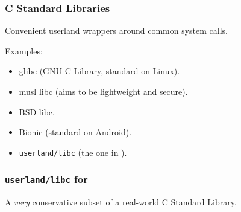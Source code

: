 \begin{frame}

\frametitle{C Standard Libraries}

\vspace{\fill}

\begin{center}

Convenient userland wrappers around common system calls.

\end{center}

\vspace{\fill}

Examples:

\begin{itemize}

\item glibc (GNU C Library, standard on Linux).

\item musl libc (aims to be lightweight and secure).

\item BSD libc.

\item Bionic (standard on Android).

\item \texttt{userland/libc} (the one in \kudos{}).

\end{itemize}

\end{frame}


\begin{frame}

\frametitle{\texttt{userland/libc} for \kudos{}}

\vspace{\fill}

\begin{center}

A \emph{very} conservative subset of a real-world C Standard Library.

\end{center}

\vspace{\fill}

\end{frame}
